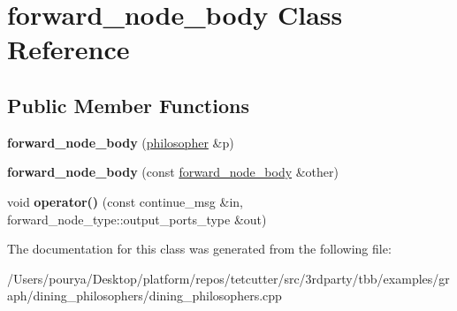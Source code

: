 \hypertarget{classforward__node__body}{}\section{forward\+\_\+node\+\_\+body Class Reference}
\label{classforward__node__body}
\subsection*{Public Member Functions}
\begin{DoxyCompactItemize}
\item 
\hypertarget{classforward__node__body_ab1b8df283da5a4afbeed962cad76a96a}{}{\bfseries forward\+\_\+node\+\_\+body} (\hyperlink{classphilosopher}{philosopher} \&p)\label{classforward__node__body_ab1b8df283da5a4afbeed962cad76a96a}

\item 
\hypertarget{classforward__node__body_a5b73a0d52eec9fb53a72c8dfb78ce915}{}{\bfseries forward\+\_\+node\+\_\+body} (const \hyperlink{classforward__node__body}{forward\+\_\+node\+\_\+body} \&other)\label{classforward__node__body_a5b73a0d52eec9fb53a72c8dfb78ce915}

\item 
\hypertarget{classforward__node__body_a7a8f8d985128e4e1d635cba2b54143fc}{}void {\bfseries operator()} (const continue\+\_\+msg \&in, forward\+\_\+node\+\_\+type\+::output\+\_\+ports\+\_\+type \&out)\label{classforward__node__body_a7a8f8d985128e4e1d635cba2b54143fc}

\end{DoxyCompactItemize}


The documentation for this class was generated from the following file\+:\begin{DoxyCompactItemize}
\item 
/\+Users/pourya/\+Desktop/platform/repos/tetcutter/src/3rdparty/tbb/examples/graph/dining\+\_\+philosophers/dining\+\_\+philosophers.\+cpp\end{DoxyCompactItemize}
